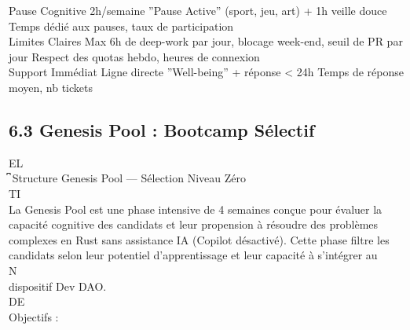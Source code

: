 \documentclass[12pt,landscape,a4paper]{article}
\begin{document}
Pause Cognitive        2h/semaine ”Pause Active” (sport, jeu, art) + 1h veille douce             Temps dédié aux pauses, taux de participation\\
Limites Claires        Max 6h de deep-work par jour, blocage week-end, seuil de PR par jour      Respect des quotas hebdo, heures de connexion\\
Support Immédiat       Ligne directe ”Well-being” + réponse \textless{} 24h                                Temps de réponse moyen, nb tickets\\
\vspace{0.5em}
\vspace{0.5em}
\vspace{0.5em}
\vspace{0.5em}
\subsection{6.3 Genesis Pool : Bootcamp Sélectif}
\vspace{0.5em}
\vspace{0.5em}
\vspace{0.5em}
\vspace{0.5em}
EL\\
͆ Structure Genesis Pool — Sélection Niveau Zéro\\
\vspace{0.5em}
\vspace{0.5em}
\vspace{0.5em}
\vspace{0.5em}
TI\\
La Genesis Pool est une phase intensive de 4 semaines conçue pour évaluer la capacité cognitive des candidats et leur propension à résoudre des problèmes\\
complexes en Rust sans assistance IA (Copilot désactivé). Cette phase filtre les candidats selon leur potentiel d’apprentissage et leur capacité à s’intégrer au\\
\vspace{0.5em}
\vspace{0.5em}
\vspace{0.5em}
\vspace{0.5em}
N\\
dispositif Dev DAO.\\
\vspace{0.5em}
\vspace{0.5em}
\vspace{0.5em}
\vspace{0.5em}
DE\\
Objectifs :\\
\end{document}
